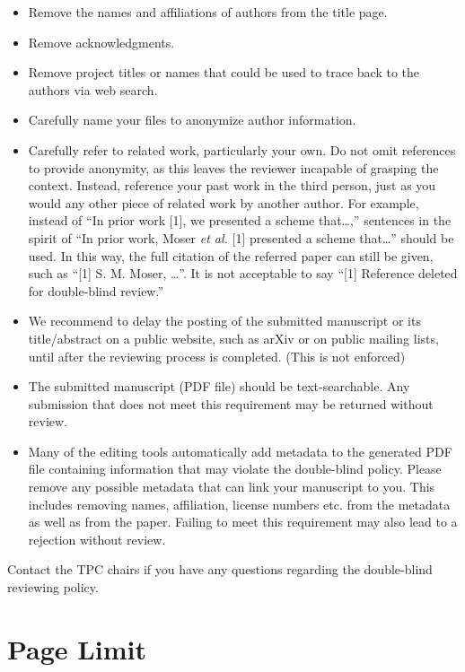 \documentclass[conference,a4paper]{IEEEtran}
\begin{document}
\begin{itemize}
\item Remove the names and affiliations of authors from the title
  page.
\item Remove acknowledgments.
\item Remove project titles or names that could be used to trace back
  to the authors via web search.  
\item Carefully name your files to anonymize author information.
\item Carefully refer to related work, particularly your own. Do not
  omit references to provide anonymity, as this leaves the reviewer
  incapable of grasping the context. Instead, reference your past work
  in the third person, just as you would any other piece of related
  work by another author. For example, instead of ``In prior work [1],
  we presented a scheme that\ldots,'' sentences in the spirit of ``In
  prior work, Moser \emph{et al.} [1] presented a scheme that\ldots''
  should be used. In this way, the full citation of the referred paper
  can still be given, such as ``[1] S. M. Moser, \ldots''.  It is not
  acceptable to say ``[1] Reference deleted for double-blind review.''
\item We recommend to delay the posting of the submitted manuscript or
  its title/abstract on a public website, such as arXiv or on public
  mailing lists, until after the reviewing process is completed. (This
  is not enforced)
\item The submitted manuscript (PDF file) should be
  text-searchable. Any submission that does not meet this requirement
  may be returned without review.
\item Many of the editing tools automatically add metadata to the
  generated PDF file containing information that may violate the
  double-blind policy. Please remove any possible metadata that can
  link your manuscript to you. This includes removing names,
  affiliation, license numbers etc. from the metadata as well as from
  the paper. Failing to meet this requirement may also lead to a
  rejection without review.
\end{itemize}

Contact the TPC chairs if you have any questions regarding the
double-blind reviewing policy. 



\section{Page Limit}
\label{sec:page-limit}
\end{document}
